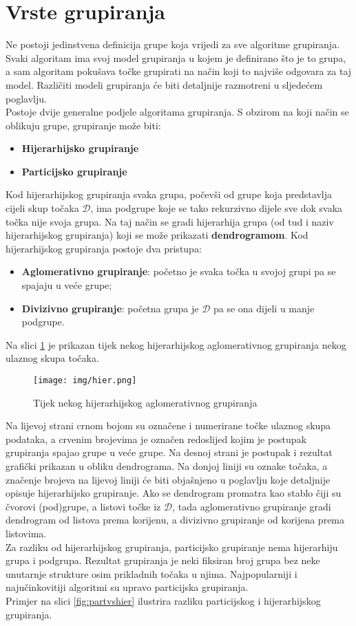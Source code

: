 \documentclass[times, utf8, zavrsni]{fer}
\begin{document}
\section{Vrste grupiranja}
\label{vrstegrupiranja}
Ne postoji jedinstvena definicija grupe koja vrijedi za sve algoritme grupiranja. Svaki algoritam ima svoj model grupiranja u kojem je definirano što je to grupa, a sam algoritam pokušava točke grupirati na način koji to najviše odgovara za taj model. Različiti modeli grupiranja će biti detaljnije razmotreni u sljedećem poglavlju.\\
Postoje dvije generalne podjele algoritama grupiranja. S obzirom na koji način se oblikuju grupe, grupiranje može biti:
\begin{itemize}
    \item \textbf{Hijerarhijsko grupiranje}
    \item \textbf{Particijsko grupiranje}
\end{itemize}
Kod hijerarhijskog grupiranja svaka grupa, počevši od grupe koja predstavlja cijeli skup točaka $\mathcal{D}$, ima podgrupe koje se tako rekurzivno dijele sve dok svaka točka nije svoja grupa. Na taj način se gradi hijerarhija grupa (od tud i naziv hijerarhijskog grupiranja) koji se može prikazati \textbf{dendrogramom}. Kod hijerarhijskog grupiranja postoje dva pristupa:
\begin{itemize}
    \item \textbf{Aglomerativno grupiranje}: početno je svaka točka u svojoj grupi pa se spajaju u veće grupe;
    \item \textbf{Divizivno grupiranje}: početna grupa je $\mathcal{D}$ pa se ona dijeli u manje podgrupe.
\end{itemize}
Na slici \ref{fig:hier_clustering} je prikazan tijek nekog hijerarhijskog aglomerativnog grupiranja nekog ulaznog skupa točaka.
\begin{figure}[H]
    \centering
    \texttt{[image: img/hier.png]}
    \caption{Tijek nekog hijerarhijskog aglomerativnog grupiranja \citep{rajpal2018hier}}
    \label{fig:hier_clustering}
\end{figure}
Na lijevoj strani crnom bojom su označene i numerirane točke ulaznog skupa podataka, a crvenim brojevima je označen redoslijed kojim je postupak grupiranja spajao grupe u veće grupe. Na desnoj strani je postupak i rezultat grafički prikazan u obliku dendrograma. Na donjoj liniji su oznake točaka, a značenje brojeva na lijevoj liniji će biti objašnjeno u poglavlju koje detaljnije opisuje hijerarhijsko grupiranje. Ako se dendrogram promatra kao stablo čiji su čvorovi (pod)grupe, a listovi točke iz $\mathcal{D}$, tada aglomerativno grupiranje gradi dendrogram od listova prema korijenu, a divizivno grupiranje od korijena prema listovima.\\
Za razliku od hijerarhijskog grupiranja, particijsko grupiranje nema hijerarhiju grupa i podgrupa. Rezultat grupiranja je neki fiksiran broj grupa bez neke unutarnje strukture osim prikladnih točaka u njima. Najpopularniji i najučinkovitiji algoritmi su upravo particijska grupiranja.\\
Primjer na slici \ref{fig:partvshier} ilustrira razliku particijskog i hijerarhijskog grupiranja.
\end{document}
